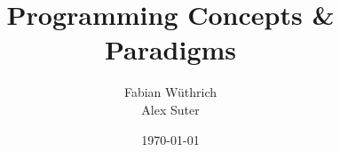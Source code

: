 \titlehead{Hochschule Luzern \\ 
	Technik \& Architektur}
\subject{Zusammenfassung}
\title{Programming Concepts \& Paradigms}
\subtitle{}
\author{Fabian Wüthrich \\ 
	Alex Suter}
\date{\today}

\maketitle